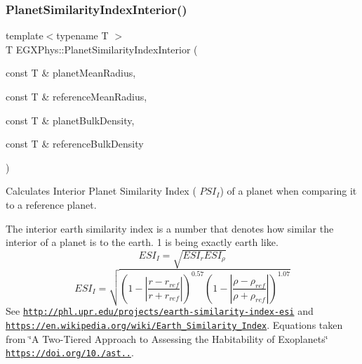 \mbox{\label{group___astrophysics_ga6dc06a1a8baf6e132abed51fcf410c7f}} 
\subsubsection{\texorpdfstring{Planet\+Similarity\+Index\+Interior()}{PlanetSimilarityIndexInterior()}}
{\footnotesize\ttfamily template$<$typename T $>$ \\
T E\+G\+X\+Phys\+::\+Planet\+Similarity\+Index\+Interior (\begin{DoxyParamCaption}\item[{const T \&}]{planet\+Mean\+Radius,  }\item[{const T \&}]{reference\+Mean\+Radius,  }\item[{const T \&}]{planet\+Bulk\+Density,  }\item[{const T \&}]{reference\+Bulk\+Density }\end{DoxyParamCaption})}



Calculates Interior Planet Similarity Index ( $PSI_I$) of a planet when comparing it to a reference planet. 

The interior earth similarity index is a number that denotes how similar the interior of a planet is to the earth. 1 is being exactly earth like. \[ESI_I=\sqrt{ESI_r ESI_\rho}\] \[ESI_I=\sqrt{\left ( 1 - \left | \frac{r-r_{ref}}{r+r_{ref}} \right | \right )^{0.57} \left ( 1 - \left | \frac{\rho-\rho_{ref}}{\rho+\rho_{ref}} \right | \right )^{1.07}}\] See \href{http://phl.upr.edu/projects/earth-similarity-index-esi}{\tt http\+://phl.\+upr.\+edu/projects/earth-\/similarity-\/index-\/esi} and \href{https://en.wikipedia.org/wiki/Earth_Similarity_Index}{\tt https\+://en.\+wikipedia.\+org/wiki/\+Earth\+\_\+\+Similarity\+\_\+\+Index}. Equations taken from \char`\"{}\+A Two-\/\+Tiered Approach to Assessing the Habitability of Exoplanets\char`\"{} \href{https://doi.org/10.1089/ast.2010.0592}{\tt https\+://doi.\+org/10./ast..}.


